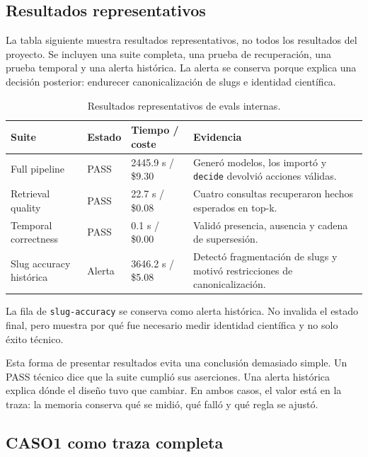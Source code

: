 \subsection{Resultados representativos}

La tabla siguiente muestra resultados representativos, no todos los resultados
del proyecto. Se incluyen una suite completa, una prueba de recuperación, una
prueba temporal y una alerta histórica. La alerta se conserva porque explica una
decisión posterior: endurecer canonicalización de slugs e identidad científica.

\begin{table}[H]
\begin{center}
\small
\begin{tabular}{|p{2.8cm}|p{1.5cm}|p{2.5cm}|p{5.6cm}|} \hline
\textbf{Suite} & \textbf{Estado} & \textbf{Tiempo / coste} & \textbf{Evidencia} \\ \hline
Full pipeline & PASS & 2445.9 s / \$9.30 & Generó modelos, los importó y \texttt{decide} devolvió acciones válidas. \\ \hline
Retrieval quality & PASS & 22.7 s / \$0.08 & Cuatro consultas recuperaron hechos esperados en top-k. \\ \hline
Temporal correctness & PASS & 0.1 s / \$0.00 & Validó presencia, ausencia y cadena de supersesión. \\ \hline
Slug accuracy histórica & Alerta & 3646.2 s / \$5.08 & Detectó fragmentación de slugs y motivó restricciones de canonicalización. \\ \hline
\end{tabular}
\caption{Resultados representativos de evals internas.}
\end{center}
\end{table}

La fila de \texttt{slug-accuracy} se conserva como alerta histórica. No invalida
el estado final, pero muestra por qué fue necesario medir identidad científica y
no solo éxito técnico.

Esta forma de presentar resultados evita una conclusión demasiado simple. Un
PASS técnico dice que la suite cumplió sus aserciones. Una alerta histórica
explica dónde el diseño tuvo que cambiar. En ambos casos, el valor está en la
traza: la memoria conserva qué se midió, qué falló y qué regla se ajustó.

\subsection{CASO1 como traza completa}

